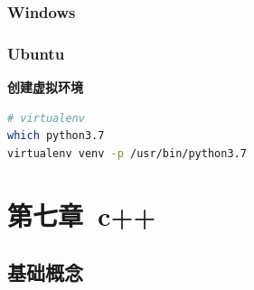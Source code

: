 \documentclass[12pt]{book}
\begin{document}
\subsection{Windows}
\subsection{Ubuntu}
\textbf{创建虚拟环境}
\begin{lstlisting}[language=bash]
# virtualenv
which python3.7
virtualenv venv -p /usr/bin/python3.7
\end{lstlisting}

\newpage

\fancyhead{}

\chapter{第七章\ c++}

\section{基础概念}
\end{document}
